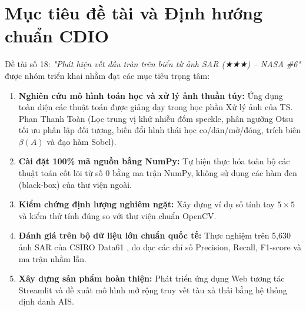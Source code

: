 \section{Mục tiêu đề tài và Định hướng chuẩn CDIO}
\label{sec:cdio_goals}
Đề tài số 18: \textit{"Phát hiện vết dầu tràn trên biển từ ảnh SAR (★★★) -- NASA \#6"} được nhóm triển khai nhằm đạt các mục tiêu trọng tâm:
\begin{enumerate}
    \item \textbf{Nghiên cứu mô hình toán học và xử lý ảnh thuần túy:} Ứng dụng toàn diện các thuật toán được giảng dạy trong học phần Xử lý ảnh của TS. Phan Thanh Toàn \cite{toan2024xla} (Lọc trung vị khử nhiễu đốm speckle, phân ngưỡng Otsu tối ưu phân lập đối tượng, biến đổi hình thái học co/dãn/mở/đóng, trích biên $\beta(A)$ và đạo hàm Sobel).
    \item \textbf{Cài đặt 100\% mã nguồn bằng NumPy:} Tự hiện thực hóa toàn bộ các thuật toán cốt lõi từ số 0 bằng ma trận NumPy, không sử dụng các hàm đen (black-box) của thư viện ngoài.
    \item \textbf{Kiểm chứng định lượng nghiêm ngặt:} Xây dựng ví dụ số tính tay $5 \times 5$ và kiểm thử tính đúng so với thư viện chuẩn OpenCV.
    \item \textbf{Đánh giá trên bộ dữ liệu lớn chuẩn quốc tế:} Thực nghiệm trên 5,630 ảnh SAR của CSIRO Data61 \cite{csiro2020sar}, đo đạc các chỉ số Precision, Recall, F1-score và ma trận nhầm lẫn.
    \item \textbf{Xây dựng sản phẩm hoàn thiện:} Phát triển ứng dụng Web tương tác Streamlit và đề xuất mô hình mở rộng truy vết tàu xả thải bằng hệ thống định danh AIS.
\end{enumerate}
